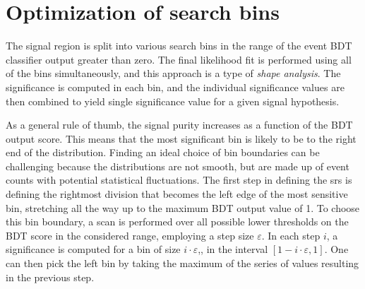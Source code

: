 \clearpage
\section{Optimization of search bins}
\label{sec:signal-regions}

The signal region is split into various search bins in the range of the event BDT classifier output greater than zero. The final likelihood fit is performed using all of the bins simultaneously, and this approach is a type of \emph{shape analysis}. The significance is computed in each bin, and the individual significance values are then combined to yield single significance value for a given signal hypothesis.

As a general rule of thumb, the signal purity increases as a function of the BDT output score. This means that the most significant bin is likely to be to the right end of the distribution. Finding an ideal choice of bin boundaries can be challenging because the distributions are not smooth, but are made up of event counts with potential statistical fluctuations. The first step in defining the \glspl{sr} is defining the rightmost division that becomes the left edge of the most sensitive bin, stretching all the way up to the maximum BDT output value of 1. To choose this bin boundary, a scan is performed over all possible lower thresholds on the BDT score in the considered range, employing a step size $\varepsilon$. In each step $i$, a significance is computed for a bin of size $i\cdot \varepsilon$,\ie, in the interval $\left[ 1-i\cdot \varepsilon, 1 \right]$. One can then pick the left bin by taking the maximum of the series of values resulting in the previous step.

